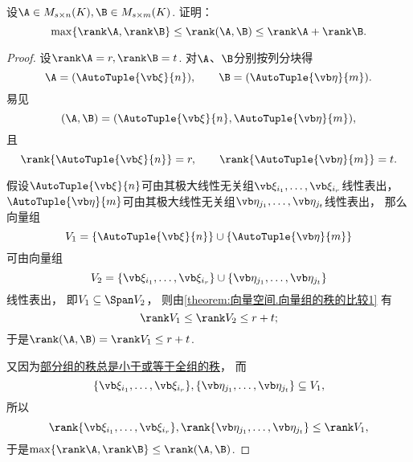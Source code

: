 \begin{example}\label{example:矩阵乘积的秩.分块矩阵的秩的等式2}
设\(\A \in M_{s \times n}(K),
\B \in M_{s \times m}(K)\).
证明：\begin{equation}
	\max\{\rank\A,\rank\B\} \leq \rank(\A,\B) \leq \rank\A + \rank\B.
\end{equation}
\begin{proof}
\def\as{\AutoTuple{\a}{n}}
\def\bs{\AutoTuple{\b}{m}}
\def\asi{\a_{i_1},\dotsc,\a_{i_r}}
\def\bsj{\b_{j_1},\dotsc,\b_{j_t}}
设\(\rank\A = r,
\rank\B = t\).
对\(\A\)、\(\B\)分别按列分块得\[
	\A = (\as),
	\qquad
	\B = (\bs).
\]
易见\[
	(\A,\B) = (\as,\bs),
\]且\[
	\rank\{\as\} = r,
	\qquad
	\rank\{\bs\} = t.
\]

假设\(\as\)可由其极大线性无关组\(\asi\)线性表出，
\(\bs\)可由其极大线性无关组\(\bsj\)线性表出，
那么向量组\[
	V_1=\{\as\}\cup\{\bs\}
\]可由向量组\[
	V_2=\{\asi\}\cup\{\bsj\}
\]线性表出，
即\(V_1 \subseteq \Span V_2\)，
则由\cref{theorem:向量空间.向量组的秩的比较1} 有\[
	\rank V_1
	\leq
	\rank V_2
	\leq
	r+t;
\]
于是\(\rank(\A,\B) = \rank V_1 \leq r+t\).

又因为\hyperref[theorem:向量空间.向量组的秩的比较2]{部分组的秩总是小于或等于全组的秩}，
而\[
	\{\asi\},\{\bsj\} \subseteq V_1,
\]
所以\[
	\rank\{\asi\},\rank\{\bsj\} \leq \rank V_1,
\]
于是\(\max\{\rank\A,\rank\B\} \leq \rank(\A,\B)\).
\end{proof}
\end{example}

